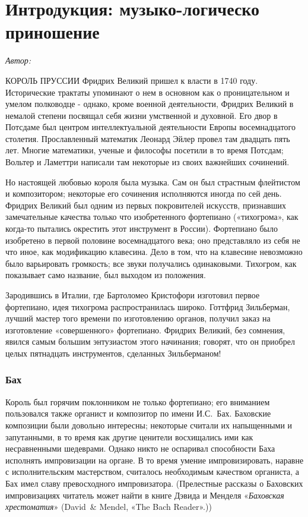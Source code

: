 \documentclass[../main.tex]{subfiles}
\begin{document}
\setcounter{chapter}{0}
\chapter{Интродукция: музыко-логическо приношение}

\emph{Автор:}

КОРОЛЬ ПРУССИИ Фридрих Великий пришел к власти в 1740 году. Исторические трактаты упоминают о нем в основном как о проницательном и умелом полководце - однако, кроме военной деятельности, Фридрих Великий в немалой степени посвящал себя жизни умственной и духовной. Его двор в Потсдаме был центром интеллектуальной деятельности Европы восемнадцатого столетия. Прославленный математик Леонард Эйлер провел там двадцать пять лет. Многие математики, ученые и философы посетили в то время Потсдам; Вольтер и Ламеттри написали там некоторые из своих важнейших сочинений.

Но настоящей любовью короля была музыка. Сам он был страстным флейтистом и композитором; некоторые его сочинения исполняются иногда по сей день. Фридрих Великий был одним из первых покровителей искусств, признавших замечательные качества только что изобретенного фортепиано («тихогрома», как когда-то пытались окрестить этот инструмент в России). Фортепиано было изобретено в первой половине восемнадцатого века; оно представляло из себя не что иное, как модификацию клавесина. Дело в том, что на клавесине невозможно было варьировать громкость; все звуки получались одинаковыми. Тихогром, как показывает само название, был выходом из положения.

Зародившись в Италии, где Бартоломео Кристофори изготовил первое фортепиано, идея тихогрома распространилась широко. Готтфрид Зильберман, лучший мастер того времени по изготовлению органов, получил заказ на изготовление «совершенного» фортепиано. Фридрих Великий, без сомнения, явился самым большим энтузиастом этого начинания; говорят, что он приобрел целых пятнадцать инструментов, сделанных Зильберманом!


\subsection{Бах}

Король был горячим поклонником не только фортепиано; его вниманием пользовался также органист и композитор по имени И.С.~Бах. Баховские композиции были довольно интересны; некоторые считали их напыщенными и запутанными, в то время как другие ценители восхищались ими как несравненными шедеврами. Однако никто не оспаривал способности Баха исполнять импровизации на органе. В то время умение импровизировать, наравне с исполнительским мастерством, считалось необходимым качеством органиста, а Бах имел славу превосходного импровизатора. (Прелестные рассказы о Баховских импровизациях читатель может найти в книге Дэвида и Менделя «\emph{Баховская хрестоматия}» (David~\& Mendel, «The Bach Reader».))
\end{document}

